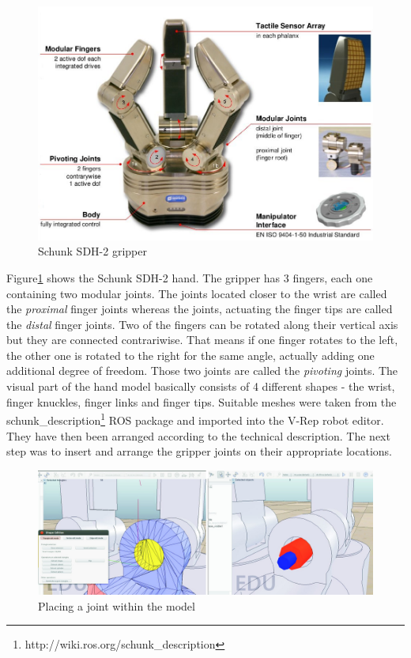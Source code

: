 \begin{figure}[ht]
	\centering
  	\includegraphics[width=1.0\textwidth]{images/sdh_sheet.jpg}
	\caption{Schunk SDH-2 gripper}
	\label{fig:sdh_sheet}
\end{figure}

Figure\ref{fig:sdh_sheet} shows the Schunk SDH-2 hand. The gripper has 3 fingers, each one containing two modular joints. The joints located closer to the wrist are called the \emph{proximal} finger joints whereas the joints, actuating the finger tips are called the \emph{distal} finger joints. Two of the fingers can be rotated along their vertical axis but they are connected contrariwise. That means if one finger rotates to the left, the other one is rotated to the right for the same angle, actually adding one additional degree of freedom. Those two joints are called the \emph{pivoting} joints. The visual part of the hand model basically consists of 4 different shapes - the wrist, finger knuckles, finger links and finger tips. Suitable meshes were taken from the schunk\_description\footnote{http://wiki.ros.org/schunk\_description} ROS package and imported into the V-Rep robot editor. They have then been arranged according to the technical description. The next step was to insert and arrange the gripper joints on their appropriate locations.

\begin{figure}[t]
	\centering
  	\includegraphics[width=1.0\textwidth]{images/place_joint.jpg}
	\caption{Placing a joint within the model}
	\label{fig:place_jnt}
\end{figure}

